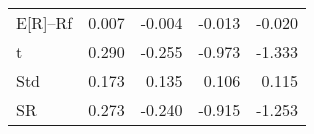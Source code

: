 \begin{tabular}{lrrrr}
\toprule
\midrule
E[R]--Rf & 0.007 & -0.004 & -0.013 & -0.020 \\
t & 0.290 & -0.255 & -0.973 & -1.333 \\
Std & 0.173 & 0.135 & 0.106 & 0.115 \\
SR & 0.273 & -0.240 & -0.915 & -1.253 \\
\bottomrule
\end{tabular}
